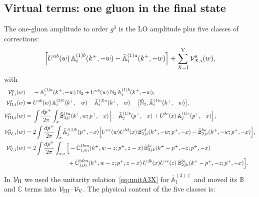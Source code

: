 \documentclass[aps,prd,onecolumn,superscriptaddress,nofootinbib,floatfix,longbibliography,11pt]{revtex4-2}
\numberwithin{equation}{section}
\def\mf#1{\mathbb{#1}}
\begin{document}
\subsection{Virtual terms: one gluon in the final state}\label{sec:groupI}

The one-gluon amplitude to order $g^3$ is the LO amplitude plus five classes of corrections:
\begin{equation}
\Big[U^{ab}(w)\,\mf A^{(1)b}_i(k^+,-w)-\bar{\mf A}^{(1)a}_i(k^+,-w)\Big]+\sum_{X={\rm I}}^{\rm V}\mathcal V^a_{X,i}(w),
\label{eq:amp1NLO}
\end{equation}
with
\begin{align}
\mathcal V^a_{{\rm I},i}(w)={}&-\bar{\mf A}^{(1)a}_i(k^+,-w)\,\mf N_2+U^{ab}(w)\,\bar{\mf N}_2\,\mf A^{(1)b}_i(k^+,-w),\label{eq:VI}\\
\mathcal V^a_{{\rm II},i}(w)={}&U^{ab}(w)\,\mf A^{(3)b}_i(k^+,-w)-\bar{\mf A}^{(3)a}_i(k^+,-w)-\big[\bar{\mf N}_2,\bar{\mf A}^{(1)a}_i(k^+,-w)\big],\label{eq:VII}\\
\mathcal V^a_{{\rm III},i}(w)={}&\int\frac{dp^+}{2\pi}\int_x\bar{\mf B}^{\dagger ba}_{3ji}(k^+,w;p^+,-x)\Big[-\bar{\mf A}^{(1)b}_j(p^+,-x)+U^{bc}(x)\,\mf A^{(1)c}_j(p^+,-x)\Big],\label{eq:VIII}\\
\mathcal V^a_{{\rm IV},i}(w)={}&2\int\frac{dp^+}{2\pi}\int_x\bar{\mf A}^{\dagger(1)b}_j(p^+,-x)\Big[U^{ac}(w)U^{bd}(x)\,\mf B^{cd}_{2ji}(k^+,-w;p^+,-x)-\bar{\mf B}^{ba}_{2ji}(k^+,-w;p^+,-x)\Big],\label{eq:VIV}\\
\mathcal V^a_{{\rm V},i}(w)={}&2\int\frac{dp^+}{2\pi}\int_{x,z}\Big[-\bar{\mf C}^{\dagger bca}_{1jki}(k^+,w-z;p^+,z-x)\,\bar{\mf B}^{bc}_{2jk}(k^+-p^+,-z;p^+,-x)\notag\\
&\hspace{6em}+\bar{\mf C}^{\dagger dca}_{1jki}(k^+,w-z;p^+,z-x)\,U^{db}(x)U^{ce}(z)\,\mf B^{be}_{2jk}(k^+-p^+,-z;p^+,-x)\Big].\label{eq:VV}
\end{align}
In $\mathcal V_{\rm II}$ we used the unitarity relation~\eqref{eq:unitA3X} for $\bar{\mf A}^{(3)\dagger}_1$ and moved its $\mf B$ and $\mf C$ terms into $\mathcal V_{\rm III}$--$\mathcal V_{\rm V}$. The physical content of the five classes is:
\end{document}
